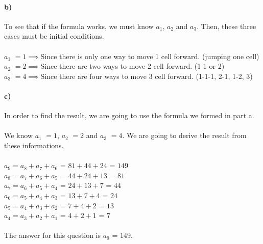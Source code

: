 \documentclass[12pt]{article}
\begin{document}
\paragraph{b)}
To see that if the formula works, we must know $a_1$, $a_2$ and $a_3$. Then, these three cases must be initial conditions.\\
\\
$a_1$ $= 1$$\implies$Since there is only one way to move 1 cell forward. (jumping one cell)\\ 
$a_2$ $= 2$$\implies$Since there are two ways to move 2 cell forward. (1-1 or 2)\\ 
$a_3$ $= 4$$\implies$Since there are four ways to move 3 cell forward. (1-1-1, 2-1, 1-2, 3)\\ 

\paragraph{c)}
In order to find the result, we are going to use the formula we formed in part a.\\
\\
We know $a_1$ $= 1$, $a_2$ $= 2$ and $a_3$ $= 4$. We are going to derive the result from these informations.\\
\\
$a_9 = a_8 + a_7 + a_6$ = $81 + 44+ 24$ = $149$\\
$a_8 = a_7 + a_6 + a_5$ = $44 + 24+ 13$ = $81$\\
$a_7 = a_6 + a_5 + a_4$ = $24 + 13+ 7$ = $44$\\
$a_6 = a_5 + a_4 + a_3$ = $13 + 7+ 4$ = $24$\\
$a_5 = a_4 + a_3 + a_2$ = $7 + 4+ 2$ = $13$\\
$a_4 = a_3 + a_2 + a_1$ = $4 + 2 + 1$ = $7$\\
\\
The answer for this question is $a_9$ = 149.\\
\end{document}
